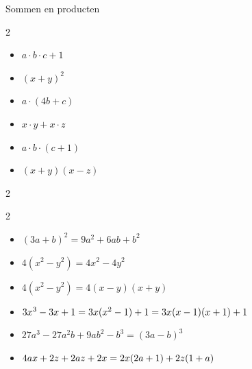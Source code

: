 
\begin{lesactiviteit}{Sommen en producten}
	
	\begin{vraagenantwoord}
  \begin{multicols}{2}
    \begin{itemize}[label=\textcolor{\rubriekkleur}{\Large\textbullet}]
		\item {$a\cdot b\cdot c +1$}
        \item {$(x+y)^2$}
        \item {$a\cdot (4b+c)$}
        \item {$x\cdot y + x\cdot z$}
        \item {$a\cdot b\cdot (c +1)$}
        \item {$(x+y)(x-z)$}
	\end{itemize}	
      
  \end{multicols}
  \begin{multicols}{2}
  \begin{vraagenantwoord}
  \end{vraagenantwoord}
        
  \end{multicols}
          
     \begin{multicols}{2}
         
     
     \begin{itemize}[label=\textcolor{\rubriekkleur}{\Large\textbullet}]
		\item {$(3a+b)^2=9a^2+6ab+b^2$}
        \item {$4(x^2 -y^2)=4x^2-4y^2$}   
        \item {$4(x^2-y^2)=4(x-y)(x+y)$}
        \item $3x^3 -3x+1 =3x(x^2-1)+1 \\=3x(x-1)(x+1)+1$
        \item {$27a^3-27a^2b+9ab^2-b^3=(3a-b)^3$}                 
        \item {$4ax +2z+2az+2x\\=2x(2a+1)+2z(1+a)$}
     \end{itemize}


\end{multicols}
\end{vraagenantwoord}
\end{lesactiviteit}

